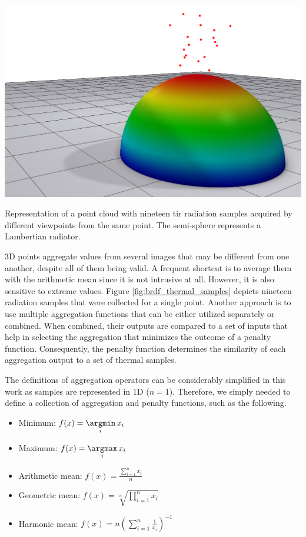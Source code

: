 \begin{marginfigure}[.0cm]
	\includegraphics{figs/thermal_projection/brdf_thermal.png}
	\caption{Representation of a point cloud with nineteen \acrshort{tir} radiation samples acquired by different viewpoints from the same point. The semi-sphere represents a Lambertian radiator. }
	\label{fig:brdf_thermal_samples}
\end{marginfigure}
3D points aggregate values from several images that may be different from one another, despite all of them being valid. A frequent shortcut is to average them with the arithmetic mean \cite{javadnejad_photogrammetric_2020} since it is not intrusive at all. However, it is also sensitive to extreme values. Figure \ref{fig:brdf_thermal_samples} depicts nineteen radiation samples that were collected for a single point. Another approach is to use multiple aggregation functions that can be either utilized separately or combined. When combined, their outputs are compared to a set of inputs that help in selecting the aggregation that minimizes the outcome of a penalty function. Consequently, the penalty function determines the similarity of each aggregation output to a set of thermal samples.

The definitions of aggregation operators can be considerably simplified in this work as samples are represented in 1D ($n = 1$). Therefore, we simply needed to define a collection of aggregation and penalty functions, such as the following.
\begin{itemize}
    \setlength\itemsep{0.3em}
    \item Minimum: $f(x) = \underset{i}{\argmin}\, x_i$
    \item Maximum: $f(x) = \underset{i}{\argmax}\, x_i$
    \setlength\itemsep{-0.1em}
    \item Arithmetic mean: $f(x) = \frac{\sum_{i=1}^{n} x_i}{n}$
    \setlength\itemsep{0.85em}
    \item Geometric mean: $f(x) = \sqrt[n]{\prod_{i=1}^{n} x_i}$
    \setlength\itemsep{0.3em}
    \item Harmonic mean: $f(x) = n\left( \sum_{i=1}^{n} \frac{1}{x_i} \right)^{-1}$
\end{itemize}

